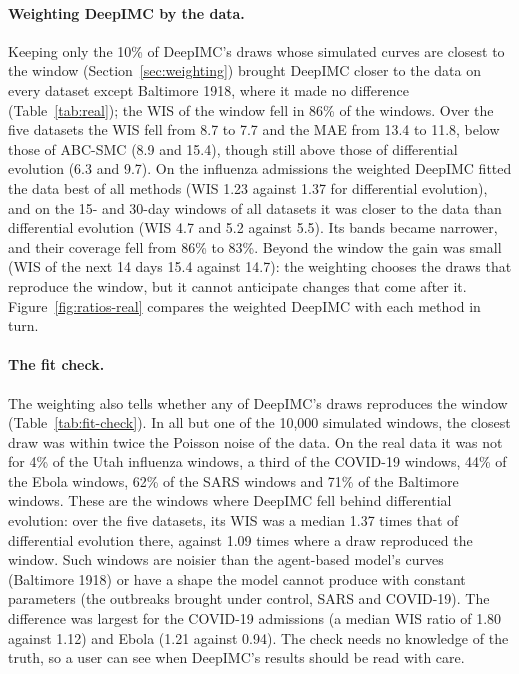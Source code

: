 \documentclass[12pt]{article}
\begin{document}
\paragraph{Weighting DeepIMC by the data.} Keeping only the 10\% of DeepIMC's draws whose simulated curves are
closest to the window (Section~\ref{sec:weighting}) brought DeepIMC closer to the data on every dataset except
Baltimore 1918, where it made no difference (Table~\ref{tab:real}); the WIS of the window fell in 86\% of the
windows. Over the five datasets the WIS fell from 8.7 to 7.7 and the MAE from 13.4 to 11.8, below those of ABC-SMC
(8.9 and 15.4), though still above those of differential evolution (6.3 and 9.7). On the influenza admissions the
weighted DeepIMC fitted the data best of all methods (WIS 1.23 against 1.37 for differential evolution), and on
the 15- and 30-day windows of all datasets it was closer to the data than differential evolution (WIS 4.7 and 5.2
against 5.5). Its bands became narrower, and their coverage fell from 86\% to 83\%. Beyond the window the gain was
small (WIS of the next 14 days 15.4 against 14.7): the weighting chooses the draws that reproduce the window, but
it cannot anticipate changes that come after it. Figure~\ref{fig:ratios-real} compares the weighted DeepIMC with
each method in turn.

\paragraph{The fit check.} The weighting also tells whether any of DeepIMC's draws reproduces the window
(Table~\ref{tab:fit-check}). In all but one of the 10,000 simulated windows, the closest draw was within twice the
Poisson noise of the data. On the real data it was not for 4\% of the Utah influenza windows, a third of the COVID-19 windows, 44\% of
the Ebola windows, 62\% of the SARS windows and 71\% of the Baltimore windows. These are the windows where DeepIMC
fell behind differential evolution: over the five datasets, its WIS was a median 1.37 times that of differential
evolution there, against 1.09 times where a draw reproduced the window. Such windows are noisier than the agent-based model's curves
(Baltimore 1918) or have a shape the model cannot produce with constant parameters (the outbreaks brought under
control, SARS and COVID-19). The difference was largest for the COVID-19 admissions (a median WIS ratio of 1.80
against 1.12) and Ebola (1.21 against 0.94). The check needs no knowledge of the truth, so a user can see when DeepIMC's results
should be read with care.
\end{document}
